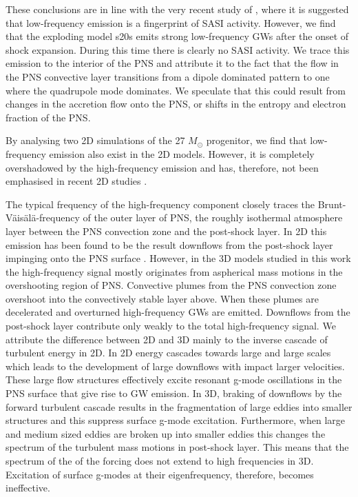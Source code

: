 These conclusions are in line with the very recent study of \cite{kuroda_16}, where it is suggested that low-frequency emission is a fingerprint of SASI activity. However, we find that the exploding model s20s
emits strong low-frequency GWs after the onset of shock expansion. During this time
there is clearly no SASI activity. We trace this emission to the interior of the PNS and
attribute it to the fact that the flow in the PNS convective layer transitions from
a dipole dominated pattern to one where the quadrupole mode dominates.
We speculate that this could result from changes in the accretion flow onto the PNS,
or shifts in the entropy and electron fraction of the PNS.

By analysing two 2D simulations of the 27 $M_\odot$ progenitor, we find that low-frequency 
emission also exist in the 2D models. However, it is completely overshadowed by the high-frequency emission and
has, therefore, not been emphasised in recent 2D studies \citep{marek_08,murphy_09,mueller_13}.

The typical frequency of the high-frequency component closely traces
the Brunt-V\"{a}is\"{a}l\"{a}-frequency of the outer layer of PNS,
the roughly isothermal atmosphere layer between the PNS convection zone 
and the post-shock layer. In 2D this emission has been found to
be the result downflows from the post-shock layer impinging onto the PNS surface \citep{marek_08,murphy_09,mueller_13}.
However, in the 3D models studied in this work the high-frequency signal mostly originates from aspherical mass motions
in the overshooting region of PNS. Convective plumes from the PNS convection zone overshoot into the convectively stable layer above. When these plumes are decelerated and overturned high-frequency GWs are emitted. 
Downflows from the post-shock layer contribute only weakly to the total high-frequency signal. 
We attribute the difference between 2D and 3D mainly to the inverse cascade of turbulent energy in 2D. 
In 2D energy cascades towards large and large scales which leads to the development of
large downflows with impact larger velocities. These large flow structures effectively excite resonant g-mode oscillations in the PNS surface that give rise to GW emission.
In 3D, braking of downflows by the forward turbulent cascade results in the fragmentation of large eddies into smaller structures
and this suppress surface g-mode excitation. Furthermore, when large and medium sized eddies are broken up into smaller
eddies this changes the spectrum of the turbulent mass motions in post-shock layer.
This means that the spectrum of the of the forcing does not extend to high frequencies in 3D.
Excitation of surface g-modes at their eigenfrequency, therefore, becomes
ineffective.

